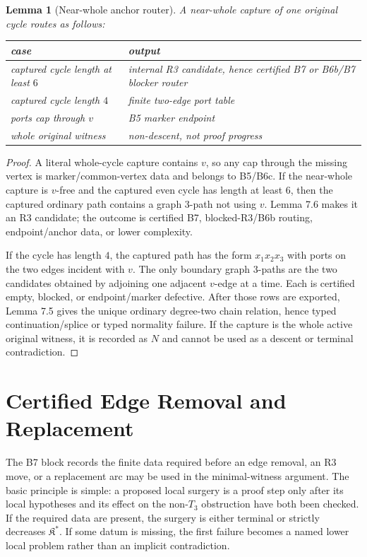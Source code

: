 \documentclass[11pt]{amsart}
\newtheorem{lemma}[theorem]{Lemma}
\theoremstyle{definition}
\begin{document}
\begin{lemma}[Near-whole anchor router]
A near-whole capture of one original cycle routes as follows:

\begin{center}
\begin{tabular}{p{}p{}}
case & output \\ \hline
captured cycle length at least \(6\) & internal R3 candidate, hence certified B7 or B6b/B7 blocker router \\
captured cycle length \(4\) & finite two-edge port table \\
ports cap through \(v\) & B5 marker endpoint \\
whole original witness & non-descent, not proof progress \\
\end{tabular}
\end{center}

\end{lemma}
\begin{proof}
A literal whole-cycle capture contains \(v\), so any cap through the missing vertex is marker/common-vertex data and belongs to B5/B6c. If the near-whole capture is \(v\)-free and the captured even cycle has length at least \(6\), then the captured ordinary path contains a graph \(3\)-path not using \(v\). Lemma 7.6 makes it an R3 candidate; the outcome is certified B7, blocked-R3/B6b routing, endpoint/anchor data, or lower complexity.

If the cycle has length \(4\), the captured path has the form \(x_1x_2x_3\) with ports on the two edges incident with \(v\). The only boundary graph \(3\)-paths are the two candidates obtained by adjoining one adjacent \(v\)-edge at a time. Each is certified empty, blocked, or endpoint/marker defective. After those rows are exported, Lemma 7.5 gives the unique ordinary degree-two chain relation, hence typed continuation/splice or typed normality failure. If the capture is the whole active original witness, it is recorded as \(N\) and cannot be used as a descent or terminal contradiction.

\end{proof}
\section{Certified Edge Removal and Replacement}

The B7 block records the finite data required before an edge removal, an R3
move, or a replacement arc may be used in the minimal-witness argument. The
basic principle is simple: a proposed local surgery is a proof step only after
its local hypotheses and its effect on the non-\(T_3\) obstruction have both been
checked. If the required data are present, the surgery is either terminal or
strictly decreases \(\mathfrak K^\ast\). If some datum is missing, the first
failure becomes a named lower local problem rather than an implicit
contradiction.
\end{document}
